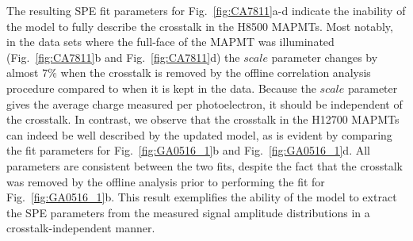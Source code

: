 The resulting SPE fit parameters for Fig.~\ref{fig:CA7811}a-d indicate the inability of the model to fully describe the crosstalk in the H8500 MAPMTs. 
Most notably, in the data sets where the full-face of the MAPMT was illuminated (Fig.~\ref{fig:CA7811}b and Fig.~\ref{fig:CA7811}d) the $scale$ parameter changes by almost $7\%$ when the crosstalk is removed by the offline correlation analysis procedure compared to when it is kept in the data. 
Because the $scale$ parameter gives the average charge measured per photoelectron, it should be independent of the crosstalk. 
In contrast, we observe that the crosstalk in the H12700 MAPMTs can indeed be well described by the updated model, as is evident by comparing the fit parameters for Fig.~\ref{fig:GA0516_1}b and Fig.~\ref{fig:GA0516_1}d. 
All parameters are consistent between the two fits, despite the fact that the crosstalk was removed by the offline analysis prior to performing the fit for Fig.~\ref{fig:GA0516_1}b. 
This result exemplifies the ability of the model to extract the SPE parameters from the measured signal amplitude distributions in a crosstalk-independent manner. 


